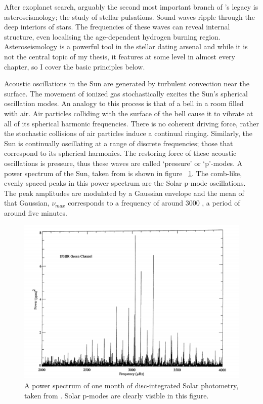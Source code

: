 After exoplanet search, arguably the second most important branch of \kepler's
legacy is asteroseismology; the study of stellar pulsations.
Sound waves ripple through the deep interiors of stars.
The frequencies of these waves can reveal internal structure, even localising
the age-dependent hydrogen burning region.
Asteroseismology is a powerful tool in the stellar dating arsenal and while it
is not the central topic of my thesis, it features at some level in almost
every chapter, so I cover the basic principles below.

Acoustic oscillations in the Sun are generated by turbulent convection near
the surface.
The movement of ionized gas stochastically excites the Sun's spherical
oscillation modes.
An analogy to this process is that of a bell in a room filled with air.
Air particles colliding with the surface of the bell cause it to vibrate at
all of its spherical harmonic frequencies.
There is no coherent driving force, rather the stochastic collisions of air
particles induce a continual ringing.
Similarly, the Sun is continually oscillating at a range of discrete
frequencies; those that correspond to its spherical harmonics.
The restoring force of these acoustic oscillations is pressure, thus these
waves are called `pressure' or `p'-modes.
A power spectrum of the Sun, taken from \citet{Brown2000} is shown in figure
~\ref{fig:solar_spectrum}.
The comb-like, evenly spaced peaks in this power spectrum are the Solar p-mode
oscillations.
The peak amplitudes are modulated by a Gaussian envelope and the mean of that
Gaussian, $\nu_{max}$ corresponds to a frequency of around 3000 \uHz, a period
of around five minutes.

\begin{figure}[p]
\begin{center}
\includegraphics[width=6in, clip=true]{figures/solar_spectrum.pdf}
\caption[Solar power spectrum.]{A power spectrum of one month of
disc-integrated Solar photometry, taken from \citet{Toutain1992}.
Solar p-modes are clearly visible in this figure.}
\label{fig:solar_spectrum}
\end{center}
\end{figure}

